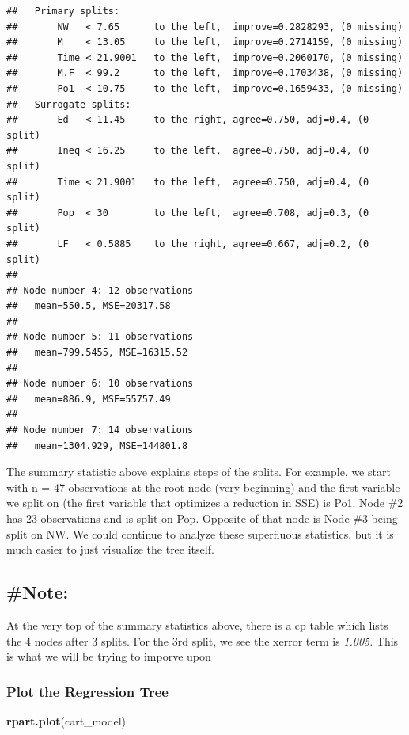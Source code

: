\documentclass[]{article}
\newenvironment{Shaded}{\begin{snugshade}}{\end{snugshade}}
\newcommand{\KeywordTok}[1]{\textcolor[rgb]{0.13,0.29,0.53}{\textbf{#1}}}
\newcommand{\NormalTok}[1]{#1}
\begin{document}
\begin{verbatim}
##   Primary splits:
##       NW   < 7.65      to the left,  improve=0.2828293, (0 missing)
##       M    < 13.05     to the left,  improve=0.2714159, (0 missing)
##       Time < 21.9001   to the left,  improve=0.2060170, (0 missing)
##       M.F  < 99.2      to the left,  improve=0.1703438, (0 missing)
##       Po1  < 10.75     to the left,  improve=0.1659433, (0 missing)
##   Surrogate splits:
##       Ed   < 11.45     to the right, agree=0.750, adj=0.4, (0 split)
##       Ineq < 16.25     to the left,  agree=0.750, adj=0.4, (0 split)
##       Time < 21.9001   to the left,  agree=0.750, adj=0.4, (0 split)
##       Pop  < 30        to the left,  agree=0.708, adj=0.3, (0 split)
##       LF   < 0.5885    to the right, agree=0.667, adj=0.2, (0 split)
## 
## Node number 4: 12 observations
##   mean=550.5, MSE=20317.58 
## 
## Node number 5: 11 observations
##   mean=799.5455, MSE=16315.52 
## 
## Node number 6: 10 observations
##   mean=886.9, MSE=55757.49 
## 
## Node number 7: 14 observations
##   mean=1304.929, MSE=144801.8
\end{verbatim}

The summary statistic above explains steps of the splits. For example,
we start with n = 47 observations at the root node (very beginning) and
the first variable we split on (the first variable that optimizes a
reduction in SSE) is Po1. Node \#2 has 23 observations and is split on
Pop. Opposite of that node is Node \#3 being split on NW. We could
continue to analyze these superfluous statistics, but it is much easier
to just visualize the tree itself.

\subsection{\#Note:}\label{note}

At the very top of the summary statistics above, there is a cp table
which lists the 4 nodes after 3 splits. For the 3rd split, we see the
xerror term is \emph{1.005}. This is what we will be trying to imporve
upon

\subsubsection{Plot the Regression Tree}\label{plot-the-regression-tree}

\begin{Shaded}
\begin{Highlighting}[]
\KeywordTok{rpart.plot}\NormalTok{(cart_model)}
\end{Highlighting}
\end{Shaded}
\end{document}
